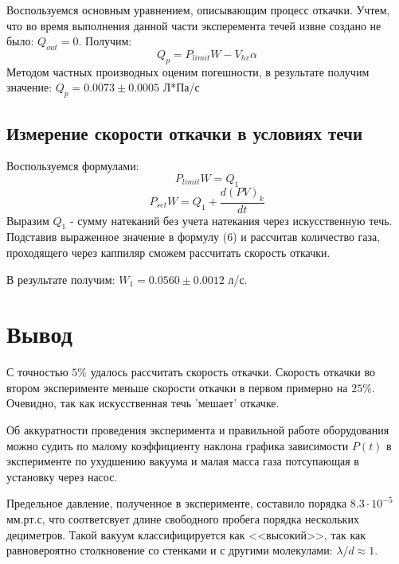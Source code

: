 \documentclass{article}
\begin{document}
Воспользуемся основным уравнением, описывающим процесс откачки. Учтем, что во время выполнения данной части эксперемента течей извне создано не было: $Q_{out} = 0$. Получим:
\begin{equation}
    Q_{p} = P_{limit}W - V_{hv} \alpha
\end{equation}
Методом частных производных оценим погешности, в результате получим значение:
$Q_{p} = 0.0073 \pm 0.0005$ Л*Па/с
\subsection{Измерение скорости откачки в условиях течи}


Воспользуемся формулами:
\begin{equation}
    P_{limit} W = Q_{1} 
\end{equation}
\begin{equation}
    P_{set} W = Q_{1}+\frac{d (P V)_{k}}{d t}
\end{equation}
Выразим $Q_{1}$ - сумму натеканий без учета натекания через искусственную течь. Подставив выраженное значение в формулу (6) и рассчитав количество газа, проходящего через каппиляр сможем рассчитать скорость откачки.

В результате получим: $W_{1} = 0.0560 \pm 0.0012$ л/с. 

\section{Вывод}


С точностью $5 \%$ удалось рассчитать скорость откачки. Скорость откачки во втором эксперименте меньше скорости откачки в первом примерно на $25 \%$. Очевидно, так как искусственная течь 'мешает' откачке. 

Об аккуратности проведения эксперимента и правильной работе оборудования можно судить по малому коэффициенту наклона графика зависимости $P(t)$ в эксперименте по ухудшению вакуума и малая масса газа потсупающая в установку через насос.

Предельное давление, полученное в эксперименте, составило порядка $8.3 \cdot 10^{-5}$ мм.рт.с, что соответсвует длине свободного пробега порядка нескольких дециметров. Такой вакуум классифицируется как <<высокий>>, так как равновероятно столкновение со стенками и с другими молекулами: $\lambda/d \approx 1$.
\end{document}
